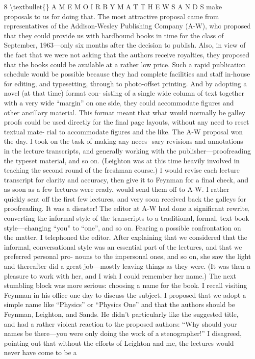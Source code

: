 \documentclass[10pt,oneside]{article}
\begin{document}
8 \textbackslash{}textbullet\{\} A  M E M O I R  B Y  M A T T H E W  S A N D S make proposals to us for doing that. The most attractive proposal came from representatives of the Addison-Wesley Publishing Company (A-W), who proposed that they could provide us with hardbound books in time for the class of September, 1963---only six months after the decision to publish. Also, in view of the fact that we were not asking that the authors receive royalties, they proposed that the books could be available at a rather low price. Such a rapid publication schedule would be possible because they had complete facilities and staff in-house for editing, and typesetting, through to photo-offset printing. And by adopting a novel (at that time) format con- sisting of a single wide column of text together with a very wide “margin” on one side, they could accommodate figures and other ancillary material. This format meant that what would normally be galley proofs could be used directly for the final page layouts, without any need to reset textual mate- rial to accommodate figures and the like. The A-W proposal won the day. I took on the task of making any neces- sary revisions and annotations in the lecture transcripts, and generally working with the publisher---proofreading the typeset material, and so on. (Leighton was at this time heavily involved in teaching the second round of the freshman course.) I would revise each lecture transcript for clarity and accuracy, then give it to Feynman for a final check, and as soon as a few lectures were ready, would send them off to A-W. I rather quickly sent off the first few lectures, and very soon received back the galleys for proofreading. It was a disaster! The editor at A-W had done a significant rewrite, converting the informal style of the transcripts to a traditional, formal, text-book style---changing “you” to “one”, and so on. Fearing a possible confrontation on the matter, I telephoned the editor. After explaining that we considered that the informal, conversational style was an essential part of the lectures, and that we preferred personal pro- nouns to the impersonal ones, and so on, she saw the light and thereafter did a great job---mostly leaving things as they were. (It was then a pleasure to work with her, and I wish I could remember her name.) The next stumbling block was more serious: choosing a name for the book. I recall visiting Feynman in his office one day to discuss the subject. I proposed that we adopt a simple name like “Physics” or “Physics One” and that the authors should be Feynman, Leighton, and Sands. He didn’t particularly like the suggested title, and had a rather violent reaction to the proposed authors: “Why should your names be there---you were only doing the work of a stenographer!” I disagreed, pointing out that without the efforts of Leighton and me, the lectures would never have come to be a\par
\end{document}
